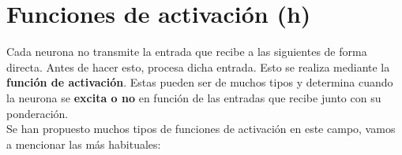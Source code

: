 \documentclass[11pt,fleqn]{book} %
\begin{document}
\section{Funciones de activación (h)}\label{sec:activacion}

Cada neurona no transmite la entrada que recibe a las siguientes de forma directa. Antes de hacer esto, procesa dicha entrada. Esto se realiza mediante la \textbf{función de activación}. Estas pueden ser de muchos tipos y determina cuando la neurona se \textbf{excita o no} en función de las entradas que recibe junto con su ponderación. \cite{article:redNeuronal2} \\

Se han propuesto muchos tipos de funciones de activación en este campo, vamos a mencionar las más habituales: \\
\end{document}
